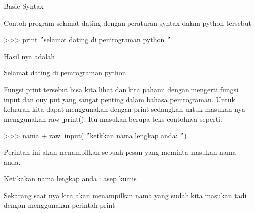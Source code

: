 
\sloppy
{\fontsize{14pt}{14pt}\selectfont \vspace{\baselineskip}
Basic Syntax \\} \par
\vspace{14pt}
\noindent 
{\fontsize{14pt}{14pt}\selectfont Contoh program selamat dating dengan peraturan syntax dalam python tersebut  \\} \par
\vspace{14pt}
\noindent 
{\fontsize{14pt}{14pt}\selectfont >>> print  $ " $selamat dating di pemrograman python $ " $ \\} \par
\vspace{14pt}
\noindent 
{\fontsize{14pt}{14pt}\selectfont Hasil nya adalah  \\} \par
\vspace{14pt}
\noindent 
{\fontsize{14pt}{14pt}\selectfont Selamat dating di pemrograman python  \\} \par
\vspace{14pt}
\noindent 
{\fontsize{14pt}{14pt}\selectfont Fungsi print tersebut bisa kita lihat dan kita pahami dengan mengerti fungsi input dan ouy put yang sangat penting dalam bahasa pemrograman. Untuk keluaran kita dapat menggunakan dengan print sedangkan untuk masukan nya menggunakan raw $  \_  $print(). Itu masukan berupa teks contohnya seperti. \\} \par
\vspace{14pt}
\noindent 
{\fontsize{14pt}{14pt}\selectfont >>> nama + raw $  \_  $input( $ " $ketkkan nama lengkap anda: $ " $) \\} \par
\vspace{14pt}
\noindent 
{\fontsize{14pt}{14pt}\selectfont Perintah ini akan menampilkan sebuah pesan yang meminta masukan nama anda. \\} \par
\vspace{14pt}
\noindent 
{\fontsize{14pt}{14pt}\selectfont Ketikakan nama lengkap anda : asep kumis \\} \par
\vspace{14pt}
\noindent 
{\fontsize{14pt}{14pt}\selectfont Sekarang saat nya kita akan menampilkan nama yang sudah kita masukan tadi dengan menggunakan perintah print \\} \par
